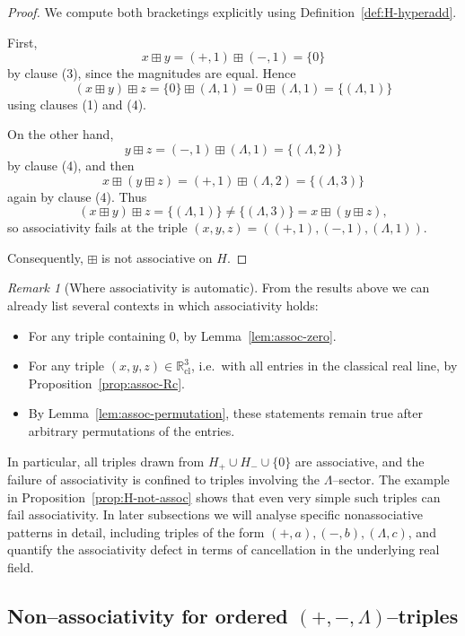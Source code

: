 \documentclass[11pt]{amsart}
\numberwithin{equation}{section}
\theoremstyle{definition}
\theoremstyle{remark}
\newtheorem{remark}[theorem]{Remark}
\newcommand{\Rc}{\mathbb{R}_{\mathrm{cl}}} %
\newcommand{\Hnum}{H}                      %
\newcommand{\op}{\boxplus}                 %
\begin{document}
\begin{proof}
We compute both bracketings explicitly using
Definition~\ref{def:H-hyperadd}.

First,
\[
  x\op y = (+,1)\op(-,1) = \{0\}
\]
by clause (3), since the magnitudes are equal.  Hence
\[
  (x\op y)\op z
  = \{0\}\op(\Lambda,1)
  = 0\op(\Lambda,1)
  = \{(\Lambda,1)\}
\]
using clauses (1) and (4).

On the other hand,
\[
  y\op z = (-,1)\op(\Lambda,1)
         = \{(\Lambda,2)\}
\]
by clause (4), and then
\[
  x\op(y\op z)
  = (+,1)\op(\Lambda,2)
  = \{(\Lambda,3)\}
\]
again by clause (4).  Thus
\[
  (x\op y)\op z
  = \{(\Lambda,1)\}
  \neq \{(\Lambda,3)\}
  = x\op(y\op z),
\]
so associativity fails at the triple $(x,y,z)=((+,1),(-,1),(\Lambda,1))$.

Consequently, $\op$ is not associative on $\Hnum$.
\end{proof}

\begin{remark}[Where associativity is automatic]
\label{rem:assoc-basic-summary}
From the results above we can already list several contexts in which
associativity holds:
\begin{itemize}[leftmargin=2em]
  \item For any triple containing $0$, by Lemma~\ref{lem:assoc-zero}.
  \item For any triple $(x,y,z)\in\Rc^3$, i.e.\ with all entries in
        the classical real line, by Proposition~\ref{prop:assoc-Rc}.
  \item By Lemma~\ref{lem:assoc-permutation}, these statements remain
        true after arbitrary permutations of the entries.
\end{itemize}
In particular, all triples drawn from $H_+\cup H_-\cup\{0\}$ are
associative, and the failure of associativity is confined to triples
involving the $\Lambda$--sector.  The example in
Proposition~\ref{prop:H-not-assoc} shows that even very simple such
triples can fail associativity.  In later subsections we will analyse
specific nonassociative patterns in detail, including triples of the
form $(+,a),(-,b),(\Lambda,c)$, and quantify the associativity defect
in terms of cancellation in the underlying real field.
\end{remark}

\subsection{Non--associativity for ordered $(+,-,\Lambda)$--triples}
\label{subsec:assoc-plus-minus-lambda}
\end{document}
